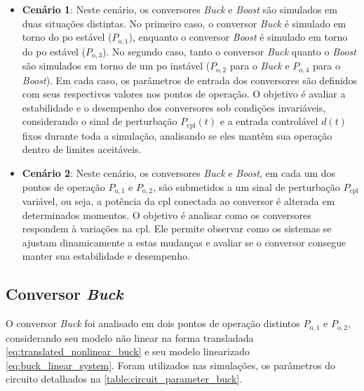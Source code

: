 \begin{itemize}
  \item \textbf{Cenário 1}: Neste cenário, os conversores \textit{Buck} e \textit{Boost} são simulados em duas situações distintas. No primeiro caso, o conversor \textit{Buck} é simulado em torno do \acrshort{po} estável ($P_{\mathrm{o}, 1}$), enquanto o conversor \textit{Boost} é simulado em torno do \acrshort{po} estável ($P_{\mathrm{o}, 3}$). No segundo caso, tanto o conversor \textit{Buck} quanto o \textit{Boost} são simulados em torno de um \acrshort{po} instável ($P_{\mathrm{o}, 2}$ para o \textit{Buck} e $P_{\mathrm{o}, 4}$ para o \textit{Boost}). Em cada caso, os parâmetros de entrada dos conversores são definidos com seus respectivos valores nos pontos de operação. O objetivo é avaliar a estabilidade e o desempenho dos conversores sob condições invariáveis, considerando o sinal de perturbação $P_{\mathrm{cpl}}(t)$ e a entrada controlável $d(t)$ fixos durante toda a simulação, analisando se eles mantêm sua operação dentro de limites aceitáveis. \label{cenario:1}
  \item \textbf{Cenário 2}: Neste cenário, os conversores \textit{Buck} e \textit{Boost}, em cada um dos pontos de operação $P_{\mathrm{o}, 1}$ e $P_{\mathrm{o}, 2}$, são submetidos a um sinal de perturbação $P_{\mathrm{cpl}}$ variável, ou seja, a potência da \acrshort{cpl} conectada ao conversor é alterada em determinados momentos. O objetivo é analisar como os conversores respondem à variações na \acrshort{cpl}. Ele permite observar como os sistemas se ajustam dinamicamente a estas mudanças e avaliar se o conversor consegue manter sua estabilidade e desempenho. \label{cenario:2}
\end{itemize}

\subsection{Conversor \textit{Buck}}

O conversor \textit{Buck} foi analisado em dois pontos de operação distintos $P_{\mathrm{o}, 1}$ e $P_{\mathrm{o}, 2}$, considerando seu modelo não linear na forma transladada \eqref{eq:translated_nonlinear_buck} e seu modelo linearizado \eqref{eq:buck_linear_system}. Foram utilizados nas simulações, os parâmetros do circuito detalhados na \autoref{table:circuit_parameter_buck}.

